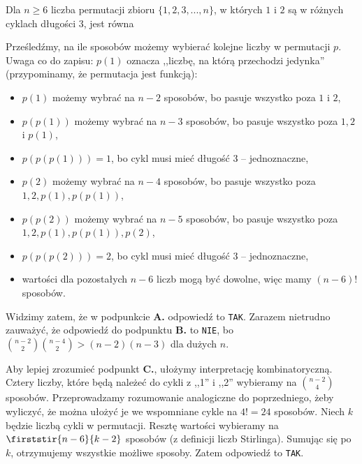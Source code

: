 \begin{exam}
    Dla $n \geq 6$ liczba permutacji zbioru $\{1, 2, 3, ..., n\}$, w których $1$ i $2$ są w różnych cyklach długości 3, jest równa
    \bigskip

    Prześledźmy, na ile sposobów możemy wybierać kolejne liczby w permutacji $p$. Uwaga co do zapisu: $p(1)$ oznacza ,,liczbę, na którą przechodzi jedynka'' (przypominamy, że permutacja jest funkcją):
    \begin{itemize}
        \item $p(1)$ możemy wybrać na $n - 2$ sposobów, bo pasuje wszystko poza $1$ i $2$,
        \item $p(p(1))$ możemy wybrać na $n - 3$ sposobów, bo pasuje wszystko poza $1, 2$ i $p(1)$,
        \item $p(p(p(1))) = 1$, bo cykl musi mieć długość $3$ -- jednoznaczne,
        \item $p(2)$ możemy wybrać na $n - 4$ sposobów, bo pasuje wszystko poza $1, 2, p(1), p(p(1))$,
        \item $p(p(2))$ możemy wybrać na $n - 5$ sposobów, bo pasuje wszystko poza $1, 2, p(1), p(p(1)), p(2)$,
        \item $p(p(p(2))) = 2$, bo cykl musi mieć długość $3$ -- jednoznaczne,
        \item wartości dla pozostałych $n - 6$ liczb mogą być dowolne, więc mamy $(n - 6)!$ sposobów.
    \end{itemize}

    Widzimy zatem, że w podpunkcie \textbf{A.} odpowiedź to \texttt{TAK}. Zarazem nietrudno zauważyć, że odpowiedź do podpunktu \textbf{B.} to \texttt{NIE}, bo $\binom{n - 2}{2} \binom{n - 4}{2} > (n - 2)(n - 3)$ dla dużych $n$.
    \bigskip

    Aby lepiej zrozumieć podpunkt \textbf{C.}, ułożymy interpretację kombinatoryczną. Cztery liczby, które będą należeć do cykli z ,,1'' i ,,2'' wybieramy na $\binom{n - 2}{4}$ sposobów.
    Przeprowadzamy rozumowanie analogiczne do poprzedniego, żeby wyliczyć, że można ułożyć je we wspomniane cykle na $4! = 24$ sposobów. Niech $k$ będzie liczbą cykli w permutacji. Resztę wartości wybieramy na $\firststir{n - 6}{k - 2}$ sposobów (z definicji liczb Stirlinga). Sumując się po $k$, otrzymujemy wszystkie możliwe sposoby. Zatem odpowiedź to \texttt{TAK}.
\end{exam}

